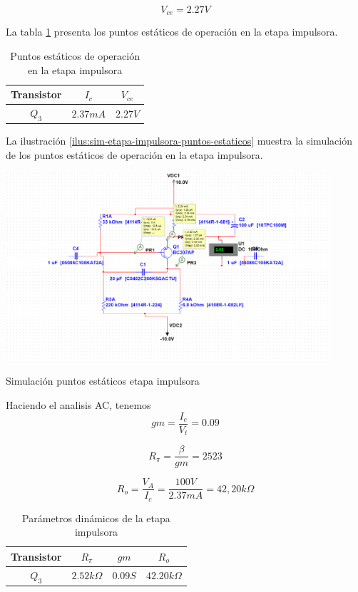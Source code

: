 $$ V_{ce} = 2.27 V$$

La tabla \ref{tab:etapa-impulsora-puntos-estaticos} presenta los puntos estáticos de operación en la etapa impulsora.

\begin{table}[ht]
    \centering
    \begin{tabular}{|c|c|c|}
        \hline
        Transistor & \textbf{$I_c$} & \textbf{$V_{ce}$} \\
        \hline
        $Q_3$ & $2.37 mA$ & $2.27 V$ \\
        \hline
    \end{tabular}
    \caption{Puntos estáticos de operación en la etapa impulsora}
    \label{tab:etapa-impulsora-puntos-estaticos}
\end{table}

La ilustración \ref{ilus:sim-etapa-impulsora-puntos-estaticos} muestra la simulación de los puntos estáticos de operación en la etapa impulsora.

\begin{ilustracion}[ht]
    \centering
    \includegraphics[width=0.9\textwidth]{src/images/p3/ punto-estatico-etapa-impulsora.png}
    \caption{Simulación puntos estáticos etapa impulsora}
    \label{ilus:sim-etapa-impulsora-puntos-estaticos}
\end{ilustracion}

Haciendo el analisis AC, tenemos 
$$gm = \frac{I_{c}}{V_t} = 0.09$$

$$R_{\pi} = \frac{\beta}{gm} = 2523$$

$$R_o = \frac{V_A}{I_c} = \frac{100V}{2.37mA} = 42,20k\Omega$$

\begin{table}[ht]
    \centering
    \begin{tabular}{|c|c|c|c|}
        \hline
        Transistor & $R_\pi$ & $gm$ & $R_o$ \\
        \hline
        $Q_3$ & $2.52 k\Omega$ & $0.09S$ & $42.20k\Omega$ \\
        \hline
    \end{tabular}
    \caption{Parámetros dinámicos de la etapa impulsora}
    \label{tab:met-etapa-impulsora-parametros-dinamicos}
\end{table}


